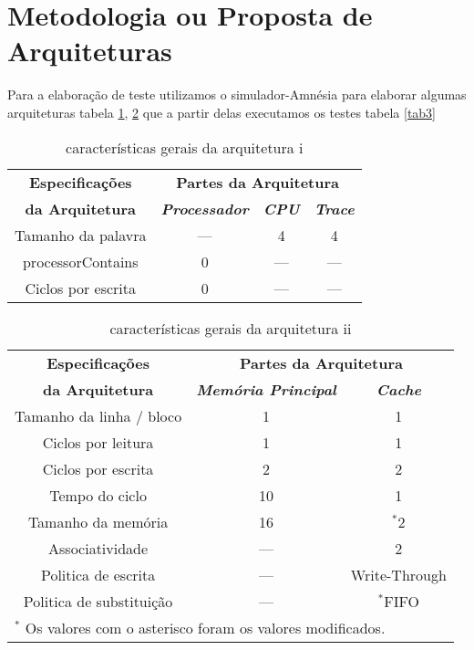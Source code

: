 \documentclass[conference]{IEEEtran}
\begin{document}
\section{Metodologia ou Proposta de Arquiteturas}

  Para a elaboração de teste utilizamos o simulador-Amnésia para elaborar algumas
arquiteturas tabela \ref{tab1}, \ref{tab2} que a partir delas executamos os testes tabela \ref{tab3}
\begin{table}[H]
  \caption{características gerais da arquitetura i}
    \centering
      \begin{tabular}{|c|c|c|c|}
          \hline
          \textbf{Especificações} & \multicolumn{3}{|c|}{\textbf{Partes da Arquitetura}} \\
          \cline{2-4} 
          \textbf{da Arquitetura} & \textbf{\textit{Processador}}& \textbf{\textit{CPU}}& \textbf{\textit{Trace}} \\
          \hline
          Tamanho da palavra & --- & 4 & 4 \\
          \hline
          processorContains & 0 & --- & --- \\
          \hline
          Ciclos por escrita & 0 & --- & --- \\
          \hline
      \end{tabular}
      \label{tab1}
\end{table}

\begin{table}[H]
  \caption{características gerais da arquitetura ii}
  \centering
      \begin{tabular}{|c|c|c|}
          \hline
          \textbf{Especificações} & \multicolumn{2}{|c|}{\textbf{Partes da Arquitetura}} \\
          \cline{2-3} 
          \textbf{da Arquitetura} & \textbf{\textit{Memória Principal}}& \textbf{\textit{Cache}} \\
          \hline
          Tamanho da linha / bloco & 1 & 1  \\
          \hline
          Ciclos por leitura & 1 & 1  \\
          \hline
          Ciclos por escrita & 2 & 2  \\
          \hline
          Tempo do ciclo & 10 & 1  \\
          \hline
          Tamanho da memória & 16 & {$^{\mathrm{*}}$}2  \\
          \hline
          Associatividade & --- & 2  \\
          \hline
          Politica de escrita & --- & Write-Through  \\
          \hline
          Politica de substituição & --- & {$^{\mathrm{*}}$}FIFO  \\
          \hline
          \multicolumn{3}{l}{$^{\mathrm{*}}$ Os valores com o asterisco foram os valores modificados.}
      \end{tabular}
      \label{tab2}
\end{table}
\end{document}
